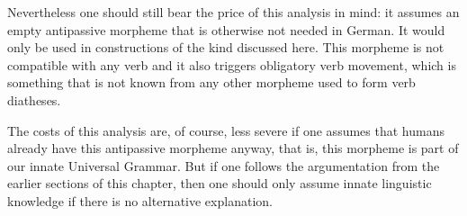 \begin{exe}
\begin{xlist}[iv.]
\begin{exe}
\begin{xlist}[iv.]
\noindent
Nevertheless one should still bear the price of this analysis in mind: it assumes an empty antipassive morpheme that is otherwise not
needed in German. It would only be used in constructions of the kind discussed here. This morpheme is not compatible with
any verb and it also triggers obligatory verb movement, which is something that is not known from any other morpheme used
to form verb diatheses.

The costs of this analysis are, of course, less severe if one assumes that humans already have this antipassive morpheme anyway, that is, this morpheme
is part of our innate Universal Grammar\indexug. But if one follows the argumentation from the earlier sections of this chapter, then one should only assume
innate linguistic knowledge if there is no alternative explanation.


\end{xlist}
\end{exe}
\end{xlist}
\end{exe}
